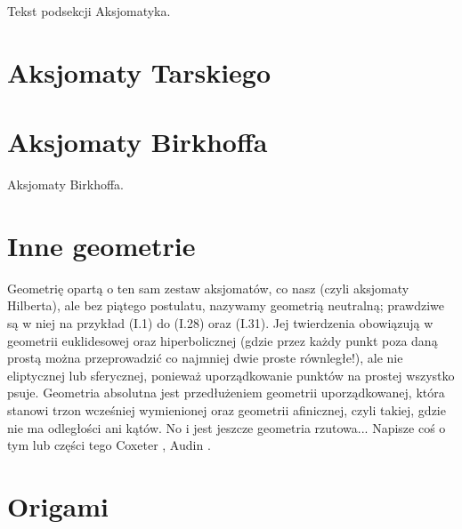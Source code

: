 %

Tekst podsekcji Aksjomatyka. \loremipsum

%

%

%

%

%
\section{Aksjomaty Tarskiego}
\loremipsum
{}
\cite{greenberg_2010}
%

\section{Aksjomaty Birkhoffa}
Aksjomaty Birkhoffa.
\loremipsum
{}

\section{Inne geometrie}
Geometrię opartą o ten sam zestaw aksjomatów, co nasz (czyli aksjomaty Hilberta), ale bez piątego postulatu, nazywamy geometrią neutralną; prawdziwe są w niej na przykład (I.1) do (I.28) oraz (I.31).
Jej twierdzenia obowiązują w geometrii euklidesowej oraz hiperbolicznej (gdzie przez każdy punkt poza daną prostą można przeprowadzić co najmniej dwie proste równległe!), ale nie eliptycznej lub sferycznej, ponieważ uporządkowanie punktów na prostej wszystko psuje.
Geometria absolutna jest przedłużeniem geometrii uporządkowanej, która stanowi trzon wcześniej wymienionej oraz geometrii afinicznej, czyli takiej, gdzie nie ma odległości ani kątów.
No i jest jeszcze geometria rzutowa...
Napisze coś o tym lub części tego Coxeter \cite[s. 193, 194]{coxeter_1967}, Audin \cite[s. 13]{audin_2003}.



\section{Origami}

%
